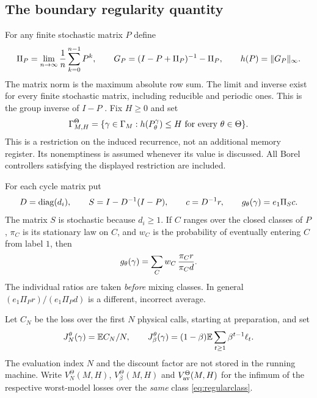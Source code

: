 \subsection{The boundary regularity quantity}
For any finite stochastic matrix $P$ define
\begin{equation}\label{eq:group}
 \Pi_P=\lim_{n\to\infty}{1\over n}\sum_{k=0}^{n-1}P^k,
 \qquad G_P=(I-P+\Pi_P)^{-1}-\Pi_P,
 \qquad h(P)=\lVert G_P\rVert_\infty.
\end{equation}
The matrix norm is the maximum absolute row sum. The limit and inverse exist for every finite stochastic matrix, including reducible and periodic ones. This is the group inverse of $I-P$ \cite{Meyer}. Fix $H\ge0$ and set
\begin{equation}\label{eq:regularclass}
 \Gamma_{M,H}^{\Theta}
 =\{\gamma\in\Gamma_M:h(P_\theta^\gamma)\le H\text{ for every }\theta\in\Theta\}.
\end{equation}
This is a restriction on the induced recurrence, not an additional memory register. Its nonemptiness is assumed whenever its value is discussed. All Borel controllers satisfying the displayed restriction are included.

For each cycle matrix put
\begin{equation}\label{eq:timechange}
 D=\operatorname{diag}(d_i),\qquad S=I-D^{-1}(I-P),\qquad c=D^{-1}r,
 \qquad g_\theta(\gamma)=e_1\Pi_Sc.
\end{equation}
The matrix $S$ is stochastic because $d_i\ge1$. If $C$ ranges over the closed classes of $P$, $\pi_C$ is its stationary law on $C$, and $w_C$ is the probability of eventually entering $C$ from label $1$, then
\begin{equation}\label{eq:classratio}
 g_\theta(\gamma)=\sum_C w_C\,{\pi_C r\over\pi_C d}.
\end{equation}
The individual ratios are taken \emph{before} mixing classes. In general $(e_1\Pi_Pr)/(e_1\Pi_Pd)$ is a different, incorrect average.

Let $C_N$ be the loss over the first $N$ physical calls, starting at preparation, and set
\[
 J_N^\theta(\gamma)=\mathbb E C_N/N,
 \qquad J_\beta^\theta(\gamma)=(1-\beta)\mathbb E\sum_{t\ge1}\beta^{t-1}\ell_t.
\]
The evaluation index $N$ and the discount factor are not stored in the running machine. Write $V_N^\Theta(M,H)$, $V_\beta^\Theta(M,H)$ and $V_{\mathrm{av}}^\Theta(M,H)$ for the infimum of the respective worst-model losses over the \emph{same} class \eqref{eq:regularclass}.

